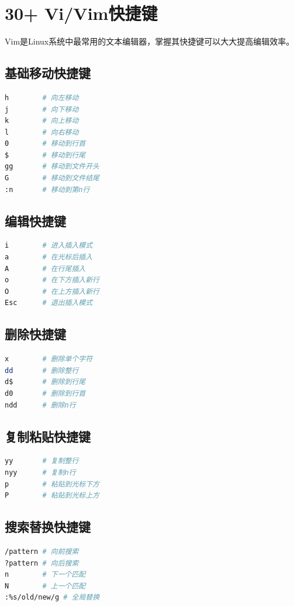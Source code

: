 \documentclass[12pt,UTF8]{ctexbook}
\begin{document}
\section{30+ Vi/Vim快捷键}
\label{sec:vim-shortcuts}

Vim是Linux系统中最常用的文本编辑器，掌握其快捷键可以大大提高编辑效率。

\subsection*{基础移动快捷键}
\begin{lstlisting}[language=bash]
h        # 向左移动
j        # 向下移动
k        # 向上移动
l        # 向右移动
0        # 移动到行首
$        # 移动到行尾
gg       # 移动到文件开头
G        # 移动到文件结尾
:n       # 移动到第n行
\end{lstlisting}

\subsection*{编辑快捷键}
\begin{lstlisting}[language=bash]
i        # 进入插入模式
a        # 在光标后插入
A        # 在行尾插入
o        # 在下方插入新行
O        # 在上方插入新行
Esc      # 退出插入模式
\end{lstlisting}

\subsection*{删除快捷键}
\begin{lstlisting}[language=bash]
x        # 删除单个字符
dd       # 删除整行
d$       # 删除到行尾
d0       # 删除到行首
ndd      # 删除n行
\end{lstlisting}

\subsection*{复制粘贴快捷键}
\begin{lstlisting}[language=bash]
yy       # 复制整行
nyy      # 复制n行
p        # 粘贴到光标下方
P        # 粘贴到光标上方
\end{lstlisting}

\subsection*{搜索替换快捷键}
\begin{lstlisting}[language=bash]
/pattern # 向前搜索
?pattern # 向后搜索
n        # 下一个匹配
N        # 上一个匹配
:%s/old/new/g # 全局替换
\end{lstlisting}
\end{document}
